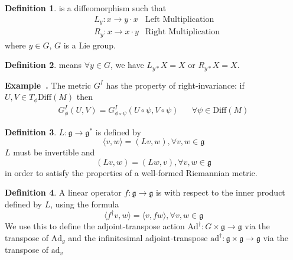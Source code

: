 \documentclass[a4paper]{article}
\theoremstyle{definition}
\newtheorem{definition}{Definition}
\theoremstyle{plain}
\newenvironment{example}[1][]{\refstepcounter{example}\par\medskip
   \noindent \textbf{Example~\theexample. #1} \rmfamily}{\medskip}
\newcounter{example}{Example}
\begin{document}
\begin{definition}
 is a diffeomorphism such that
\begin{align*}
    &L_y:x\rightarrow y\cdot x & \text{Left Multiplication}\\
    &R_y:x\rightarrow x\cdot y & \text{Right Multiplication}
\end{align*}
where $y\in G$, $G$ is a Lie group.
\end{definition}

\begin{definition}
 means $\forall y\in G$, we have $L_{y*}X=X \text{ or } R_{y*}X=X$.
\end{definition}

\begin{example}
The metric $G^I$ has the property of right-invariance: if $U,V\in T_\phi\mathrm{Diff}(M)$ then
\begin{align*}
    G^I_\phi(U,V)=G^I_{\phi\circ\psi}(U\circ\psi,V\circ\psi) && \forall\psi\in\mathrm{Diff}(M)
\end{align*}
\end{example}

\begin{definition}
 $L:\mathfrak{g}\rightarrow\mathfrak{g}^*$ is defined by
\begin{equation*}
    \langle v,w\rangle=(Lv,w), \forall v,w\in\mathfrak{g}
\end{equation*}
$L$ must be invertible and
\begin{equation*}
    (Lv,w)=(Lw,v), \forall v,w\in\mathfrak{g}
\end{equation*}
in order to satisfy the properties of a well-formed Riemannian metric.
\end{definition}

\begin{definition}
A linear operator $f:\mathfrak{g}\rightarrow\mathfrak{g}$ is  with respect to the inner product defined by $L$, using the formula
\begin{equation*}
    \langle f^\dagger v,w\rangle=\langle v,fw\rangle, \forall v,w\in\mathfrak{g}
\end{equation*}
We use this to define the adjoint-transpose action $\mathrm{Ad}^\dagger:G\times\mathfrak{g}\rightarrow\mathfrak{g}$ via the transpose of $\mathrm{Ad}_g$ and the infinitesimal adjoint-transpose $\mathrm{ad}^\dagger:\mathfrak{g}\times\mathfrak{g}\rightarrow\mathfrak{g}$ via the transpose of $\mathrm{ad}_v$
\end{definition}
\end{document}

